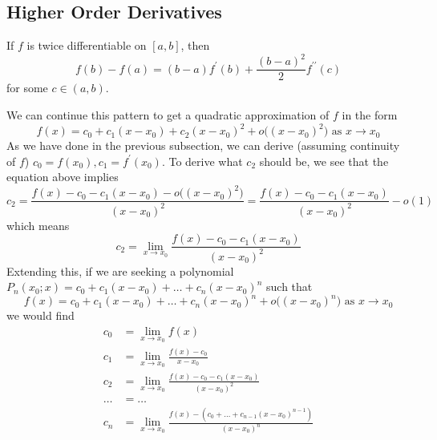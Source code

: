 \subsection{Higher Order Derivatives}

  \begin{corollary}
    If $f$ is twice differentiable on $[a, b]$, then 
    \begin{equation}
      f(b) - f(a) = (b - a) f^\prime (b) + \frac{(b-a)^2}{2} f^{\prime \prime} (c)
    \end{equation}
    for some $c \in (a, b)$. 
  \end{corollary} 

  We can continue this pattern to get a quadratic approximation of $f$ in the form
  \begin{equation}
    f(x) = c_0 + c_1 (x - x_0) + c_2 (x - x_0)^2 + o\big((x - x_0)^2 \big) \text{ as } x \rightarrow x_0
  \end{equation}
  As we have done in the previous subsection, we can derive (assuming continuity of $f$) $c_0 = f(x_0), c_1 = f^\prime (x_0)$. To derive what $c_2$ should be, we see that the equation above implies
  \begin{equation}
    c_2 = \frac{f(x) - c_0 - c_1 (x - x_0) - o\big((x - x_0)^2 \big)}{(x - x_0)^2} = \frac{f(x) - c_0 - c_1 (x - x_0)}{(x - x_0)^2} - o(1)
  \end{equation}
  which means
  \begin{equation}
    c_2 = \lim_{x \rightarrow x_0} \frac{f(x) - c_0 - c_1 (x - x_0)}{(x - x_0)^2}
  \end{equation}
  Extending this, if we are seeking a polynomial $P_n(x_0; x) = c_0 + c_1 (x - x_0) + \ldots + c_n (x - x_0)^n$ such that
  \begin{equation}
    f(x) = c_0 + c_1 (x - x_0) + \ldots + c_n (x - x_0)^n + o\big((x - x_0)^n\big) \text{ as } x \rightarrow x_0
  \end{equation}
  we would find 
  \begin{align}
      c_0 & = \lim_{x \rightarrow x_0} f(x) \\
      c_1 & = \lim_{x \rightarrow x_0} \frac{f(x) - c_0}{x - x_0} \\
      c_2 & = \lim_{x \rightarrow x_0} \frac{f(x) - c_0 - c_1 (x - x_0)}{(x - x_0)^2} \\
      \ldots & = \ldots \\
      c_n & = \lim_{x \rightarrow x_0} \frac{f(x) - (c_0 + \ldots + c_{n-1}(x - x_0)^{n-1})}{(x - x_0)^n}
  \end{align}

